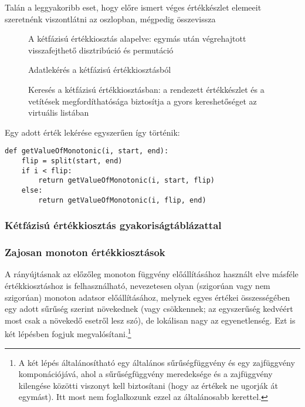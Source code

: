 \documentclass[
    parspace, %
    noindent, %
]{elteiktdk}[2023/10/30]
\begin{document}
Talán a leggyakoribb eset, hogy előre ismert véges értékkészlet elemeeit szeretnénk viszontlátni az oszlopban,
mégpedig összevissza

\begin{figure}[H]
\centering

\caption{A kétfázisú értékkiosztás alapelve: egymás után végrehajtott visszafejthető disztribúció és permutáció}
\label{A kétfázisú értékkiosztás alapelve}
\end{figure}

\begin{figure}[H]
\centering

\caption{Adatlekérés a kétfázisú értékkiosztásból}
\label{Adatlekérés a kétfázisú értékkiosztásból}
\end{figure}

\begin{figure}[H]
\centering

\caption{Keresés a kétfázisú értékkiosztásban: a rendezett értékkészlet és a vetítések megfordíthatósága biztosítja a gyors kereshetőséget az virtuális listában}
\label{Keresés a kétfázisú értékkiosztásban}
\end{figure}

Egy adott érték lekérése egyszerűen így történik:

\begin{verbatim}
def getValueOfMonotonic(i, start, end):
    flip = split(start, end)
    if i < flip:
        return getValueOfMonotonic(i, start, flip)
    else:
        return getValueOfMonotonic(i, flip, end)
\end{verbatim}


\subsubsection{Kétfázisú értékkiosztás gyakoriságtáblázattal}


\subsubsection{Zajosan monoton értékkiosztások}

A rányújtásnak az előzőleg monoton függvény előállításához használt elve
másféle értékkiosztáshoz is felhasználható,
nevezetesen olyan (szigorúan vagy nem szigorúan) monoton adatsor előállításához,
melynek egyes értékei összességében egy adott sűrűség szerint növekednek
(vagy csökkennek; az egyszerűség kedvéért most csak a növekedő esetről lesz szó),
de lokálisan nagy az egyenetlenség.
Ezt is két lépésben fogjuk megvalósítani.\footnote{
  A két lépés általánosítható egy általános sűrűségfüggvény és egy zajfüggvény komponációjává,
  ahol a sűrűségfüggvény meredeksége és a zajfüggvény kilengése közötti viszonyt kell biztosítani
  (hogy az értékek ne ugorják át egymást).
  Itt most nem foglalkozunk ezzel az általánosabb kerettel.
}
\end{document}
